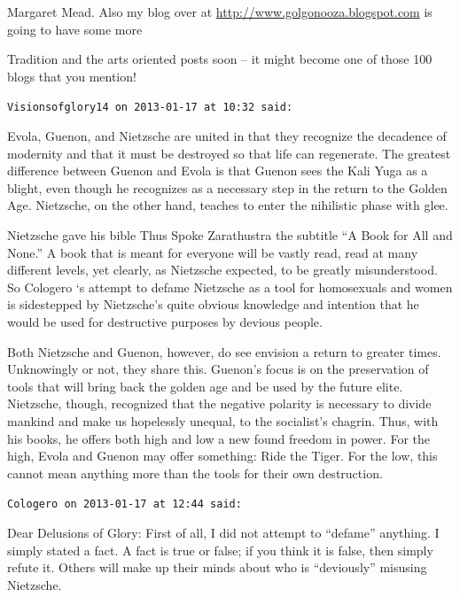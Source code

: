 \begin{footnotesize}
\begin{sffamily}
Margaret Mead. Also my blog over at \url{http://www.golgonooza.blogspot.com} is going to have some more

Tradition and the arts oriented posts soon -- it might become one of those 100 blogs that you mention!

\hfill

\texttt{Visionsofglory14 on 2013-01-17 at 10:32 said:}

Evola, Guenon, and Nietzsche are united in that they recognize the decadence of modernity and that it must be destroyed so that life can regenerate. The greatest difference between Guenon and Evola is that Guenon sees the Kali Yuga as a blight, even though he recognizes as a necessary step in the return to the Golden Age. Nietzsche, on the other hand, teaches to enter the nihilistic phase with glee.

Nietzsche gave his bible Thus Spoke Zarathustra the subtitle ``A Book for All and None.'' A book that is meant for everyone will be vastly read, read at many different levels, yet clearly, as Nietzsche expected, to be greatly misunderstood. So Cologero `s attempt to defame Nietzsche as a tool for homosexuals and women is sidestepped by Nietzsche's quite obvious knowledge and intention that he would be used for destructive purposes by devious people.

Both Nietzsche and Guenon, however, do see envision a return to greater times. Unknowingly or not, they share this. Guenon's focus is on the preservation of tools that will bring back the golden age and be used by the future elite. Nietzsche, though, recognized that the negative polarity is necessary to divide mankind and make us hopelessly unequal, to the socialist's chagrin. Thus, with his books, he offers both high and low a new found freedom in power. For the high, Evola and Guenon may offer something: Ride the Tiger. For the low, this cannot mean anything more than the tools for their own destruction.

\hfill

\texttt{Cologero on 2013-01-17 at 12:44 said:}

Dear Delusions of Glory: First of all, I did not attempt to ``defame'' anything. I simply stated a fact. A fact is true or false; if you think it is false, then simply refute it. Others will make up their minds about who is ``deviously'' misusing Nietzsche.


\end{sffamily}
\end{footnotesize}
